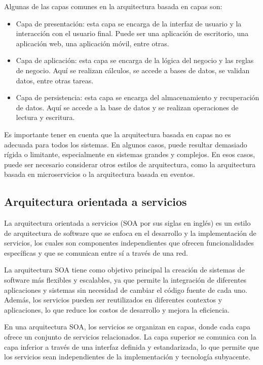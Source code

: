 \documentclass[executivepaper]{article}
\begin{document}
Algunas de las capas comunes en la arquitectura basada en capas son:

\begin{itemize}
\item Capa de presentación: esta capa se encarga de la interfaz de usuario y la interacción con el usuario final. Puede ser una aplicación de escritorio, una aplicación web, una aplicación móvil, entre otras.
\item Capa de aplicación: esta capa se encarga de la lógica del negocio y las reglas de negocio. Aquí se realizan cálculos, se accede a bases de datos, se validan datos, entre otras tareas.
\item Capa de persistencia: esta capa se encarga del almacenamiento y recuperación de datos. Aquí se accede a la base de datos y se realizan operaciones de lectura y escritura.
\end{itemize}

Es importante tener en cuenta que la arquitectura basada en capas no es adecuada para todos los sistemas. En algunos casos, puede resultar demasiado rígida o limitante, especialmente en sistemas grandes y complejos. En esos casos, puede ser necesario considerar otros estilos de arquitectura, como la arquitectura basada en microservicios o la arquitectura basada en eventos.

\subsection{Arquitectura orientada a servicios}

La arquitectura orientada a servicios (SOA por sus siglas en inglés) es un estilo de arquitectura de software que se enfoca en el desarrollo y la implementación de servicios, los cuales son componentes independientes que ofrecen funcionalidades específicas y que se comunican entre sí a través de una red.

La arquitectura SOA tiene como objetivo principal la creación de sistemas de software más flexibles y escalables, ya que permite la integración de diferentes aplicaciones y sistemas sin necesidad de cambiar el código fuente de cada uno. Además, los servicios pueden ser reutilizados en diferentes contextos y aplicaciones, lo que reduce los costos de desarrollo y mejora la eficiencia.

En una arquitectura SOA, los servicios se organizan en capas, donde cada capa ofrece un conjunto de servicios relacionados. La capa superior se comunica con la capa inferior a través de una interfaz definida y estandarizada, lo que permite que los servicios sean independientes de la implementación y tecnología subyacente.
\end{document}
